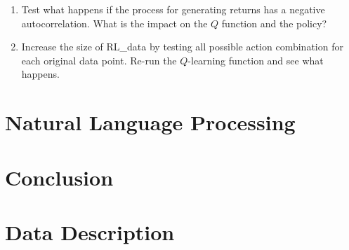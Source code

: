 \documentclass[]{krantz}
\theoremstyle{definition}
\theoremstyle{definition}
\theoremstyle{definition}
\theoremstyle{remark}
\begin{document}
\begin{enumerate}
\def\labelenumi{\arabic{enumi}.}
\item
  Test what happens if the process for generating returns has a negative
  autocorrelation. What is the impact on the \(Q\) function and the
  policy?
\item
  Increase the size of RL\_data by testing all possible action
  combination for each original data point. Re-run the \(Q\)-learning
  function and see what happens.
\end{enumerate}

\hypertarget{NLP}{%
\chapter{Natural Language Processing}\label{NLP}}

\citet{loughran2016textual}

\citet{gentzkow2019text}

\citet{cong2019analyzing}

\citet{cong2019textual}

\hypertarget{conclusion}{%
\chapter{Conclusion}\label{conclusion}}

\hypertarget{appendix-appendix}{%
\appendix {}}


\hypertarget{data-description}{%
\chapter{Data Description}\label{data-description}}
\end{document}
